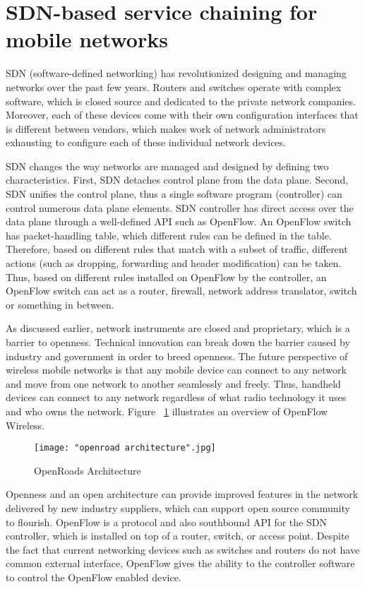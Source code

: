 \section{SDN-based service chaining for mobile networks}

SDN (software-defined networking) has revolutionized designing and managing networks over the past few years. Routers and switches operate with complex software, which is closed source and dedicated to the private network companies. Moreover, each of these devices come with their own configuration interfaces that is different between vendors, which makes work of network administrators exhausting to configure each of these individual network devices. \cite{FRZ13}

SDN changes the way networks are managed and designed by defining two characteristics. First, SDN detaches control plane from the data plane. Second, SDN unifies the control plane, thus a single software program (controller) can control numerous data plane elements. SDN controller has direct access over the data plane through a well-defined API such as OpenFlow. An OpenFlow switch has packet-handling table, which different rules can be defined in the table. Therefore, based on different rules that match with a subset of traffic, different actions (such as dropping, forwarding and header modification) can be taken. Thus, based on different rules installed on OpenFlow by the controller, an OpenFlow switch can act as a router, firewall, network address translator, switch or something in between. 

As discussed earlier, network instruments are closed and proprietary, which is a barrier to openness. Technical innovation can break down the barrier caused by industry and government in order to breed openness. The future perspective of wireless mobile networks is that any mobile device can connect to any network and move from one network to another seamlessly and freely. Thus, handheld devices can connect to any network regardless of what radio technology it uses and who owns the network. Figure ~\ref{fig:openroads} illustrates an overview of OpenFlow Wireless. \cite{Yap10a}

\begin{figure}[h!t]
\centering
{}
\texttt{[image: "openroad architecture".jpg]}
\caption{OpenRoads Architecture \cite{Yap10b}}
\label{fig:openroads}
\end{figure}

Openness and an open architecture can provide improved features in the network delivered by new industry suppliers, which can support open source community to flourish. OpenFlow is a protocol and also southbound API for the SDN controller, which is installed on top of a router, switch, or access point. Despite the fact that current networking devices such as switches and routers do not have common external interface, OpenFlow gives the ability to the controller software to control the OpenFlow enabled device. 

